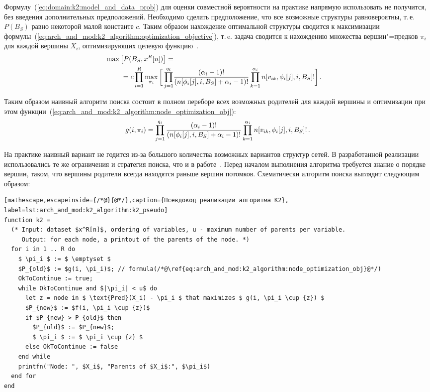 Формулу~(\ref{eq:domain:k2:model_and_data_prob}) для оценки совместной вероятности на практике напрямую использовать не получится, без введения дополнительных предположений.
Необходимо сделать предположение, что все возможные структуры равновероятны, т.\,е. $P(B_S)$ равно некоторой малой константе $c$.
Таким образом нахождение оптимальной структуры сводится к максимизации формулы~(\ref{eq:arch_and_mod:k2_algorithm:optimization_objective}), т.\,e. задача сводится к нахождению множества вершин"=предков $ \pi_i $ для каждой вершины $X_i$, оптимизирующих целевую функцию~\cite{Cooper1991}.
\begin{align}
  \label{eq:arch_and_mod:k2_algorithm:optimization_objective}
  \max \left[ P(B_S, x^R[n]) \right] = \notag\\
  =
    c \prod_{i = 1}^{R} \max_{\pi_i} 
    \bigg[
      \prod_{j = 1}^{q_i} &%
      \frac{(\alpha_i - 1)!}
           {(n[\phi_i[j], i, B_S] + \alpha_i - 1)!}
      \prod_{k = 1}^{\alpha_i}
        n[v_{ik}, \phi_i[j], i, B_S]! 
    \bigg] \text{\,.}
\end{align}

Таким образом наивный алгоритм поиска состоит в полном переборе всех возможных родителей для каждой вершины и оптимизации при этом функции~(\ref{eq:arch_and_mod:k2_algorithm:node_optimization_obj}):
\begin{equation}
  \label{eq:arch_and_mod:k2_algorithm:node_optimization_obj}
  g(i, \pi_i) =       
    \prod_{j = 1}^{q_i}
      \frac{(\alpha_i - 1)!}
           {(n[\phi_i[j], i, B_S] + \alpha_i - 1)!}
      \prod_{k = 1}^{\alpha_i}
        n[v_{ik}, \phi_i[j], i, B_S]! \text{\,.}
\end{equation}

На практике наивный вариант не годится из-за большого количества возможных вариантов структур сетей.
В разработанной реализации использовались те же ограничения и стратегия поиска, что и в работе~\cite{Cooper1991}.
Перед началом выполнения алгоритма требуется знание о порядке вершин, таком, что вершины родители всегда находятся раньше вершин потомков.
Схематически алгоритм поиска выглядит следующим образом:

\begin{lstlisting}[mathescape,escapeinside={/*@}{@*/},caption={Псевдокод реализации алгоритма К2}, label=lst:arch_and_mod:k2_algorithm:k2_pseudo]
function k2 =
  (* Input: dataset $x^R[n]$, ordering of variables, u - maximum number of parents per variable.
     Output: for each node, a printout of the parents of the node. *)
  for i in 1 .. R do
    $ \pi_i $ := $ \emptyset $
    $P_{old}$ := $g(i, \pi_i)$; // formula(/*@\ref{eq:arch_and_mod:k2_algorithm:node_optimization_obj}@*/)
    OkToContinue := true;
    while OkToContinue and $|\pi_i| < u$ do
      let z = node in $ \text{Pred}(X_i) - \pi_i $ that maximizes $ g(i, \pi_i \cup {z}) $
      $P_{new}$ := $f(i, \pi_i \cup {z})$
      if $P_{new} > P_{old}$ then
        $P_{old}$ := $P_{new}$;
        $ \pi_i $ := $ \pi_i \cup {z} $
      else OkToContinue := false
    end while
    printfn("Node: ", $X_i$, "Parents of $X_i$:", $\pi_i$)
  end for
end
\end{lstlisting}

